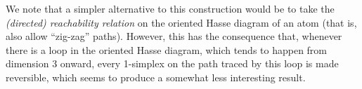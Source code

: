 We note that a simpler alternative to this construction would be to take the \emph{(directed) reachability relation} on the oriented Hasse diagram of an atom (that is, also allow ``zig-zag'' paths).
However, this has the consequence that, whenever there is a loop in the oriented Hasse diagram, which tends to happen from dimension 3 onward, every 1-simplex on the path traced by this loop is made reversible, which seems to produce a somewhat less interesting result.
